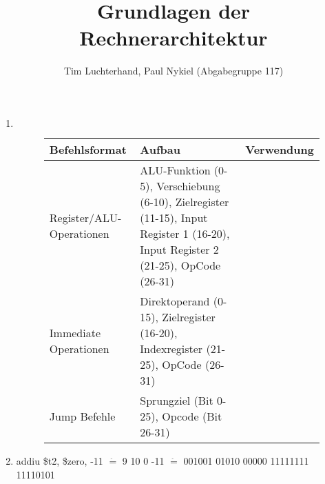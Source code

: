 \documentclass[DIN, pagenumber=false, fontsize=11pt, parskip=half]{scrartcl}
\title{Grundlagen der Rechnerarchitektur}
\author{Tim Luchterhand, Paul Nykiel (Abgabegruppe 117)}
\begin{document}
    \maketitle
    \section{}
    \begin{enumerate}[label=(\alph*)]
        \item $ $
            \begin{figure}[H]
                \centering
                \begin{tabular}{lp{7cm}l}
                    \toprule
                    Befehlsformat & Aufbau & Verwendung \\
                    \midrule
                    Register/ALU-Operationen & ALU-Funktion (0-5), Verschiebung (6-10), Zielregister (11-15), Input Register 1 (16-20), Input Register 2 (21-25), OpCode (26-31) & \\
                    Immediate Operationen & Direktoperand (0-15), Zielregister (16-20), Indexregister (21-25), OpCode (26-31) & \\
                    Jump Befehle & Sprungziel (Bit 0-25), Opcode (Bit 26-31) & \\
                    \bottomrule
                \end{tabular}
            \end{figure}
        \item 
            addiu \$t2, \$zero, -11 $\stackrel{\hat{}}{=}$ 9 10 0 -11 $\stackrel{\hat{}}{=}$ 001001 01010 00000 11111111 11110101
    \end{enumerate}
\end{document}
